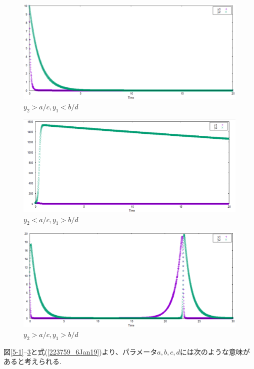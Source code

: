 \documentclass[a4j,titlepage]{jsarticle}
\begin{document}
\begin{figure}[H]
\centering
\includegraphics[scale=0.5]{./img/kadai5_2.eps}
\caption{$y_2>a/c,y_1<b/d$}
\label{5-2}
\end{figure}

\begin{figure}[H]
\centering
\includegraphics[scale=0.5]{./img/kadai5_3.eps}
\caption{$y_2<a/c,y_1>b/d$}
\label{5-3}
\end{figure}

\begin{figure}[H]
\centering
\includegraphics[scale=0.5]{./img/kadai5_4.eps}
\caption{$y_2>a/c,y_1>b/d$}
\label{5-4}
\end{figure}

図\ref{5-1}--\ref{5-4}と式(\ref{223759_6Jan19})より、パラメータ$a,b,c,d$には次のような意味があると考えられる.
\end{document}
